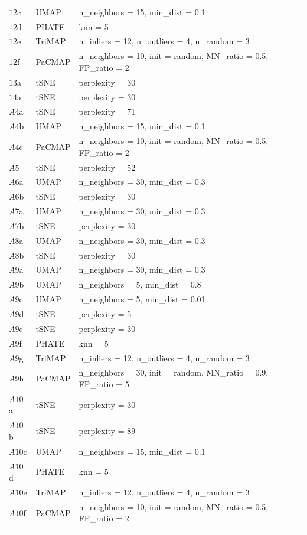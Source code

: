 \documentclass[
  11pt,
  a4paper,
]{report}
\begin{document}
\begin{longtable}{>{\raggedright\arraybackslash}p{1.5cm}>{\raggedright\arraybackslash}p{2cm}>{\raggedright\arraybackslash}p{10cm}}
$12$c & UMAP & n\_neighbors = 15, min\_dist = 0.1\\
$12$d & PHATE & knn = 5\\
$12$e & TriMAP & n\_inliers = 12, n\_outliers = 4, n\_random = 3\\
$12$f & PaCMAP & n\_neighbors = 10, init = random, MN\_ratio = 0.5, FP\_ratio = 2\\
\midrule
$13$a & tSNE & perplexity = 30\\
\midrule
$14$a & tSNE & perplexity = 30\\
\midrule
$A4$a & tSNE & perplexity = 71\\
$A4$b & UMAP & n\_neighbors = 15, min\_dist = 0.1\\
$A4$c & PaCMAP & n\_neighbors = 10, init = random, MN\_ratio = 0.5, FP\_ratio = 2\\
\midrule
$A5$ & tSNE & perplexity = 52\\
\midrule
$A6$a & UMAP & n\_neighbors = 30, min\_dist = 0.3\\
$A6$b & tSNE & perplexity = 30\\
\midrule
$A7$a & UMAP & n\_neighbors = 30, min\_dist = 0.3\\
$A7$b & tSNE & perplexity = 30\\
\midrule
$A8$a & UMAP & n\_neighbors = 30, min\_dist = 0.3\\
$A8$b & tSNE & perplexity = 30\\
\midrule
$A9$a & UMAP & n\_neighbors = 30, min\_dist = 0.3\\
$A9$b & UMAP & n\_neighbors = 5, min\_dist = 0.8\\
$A9$c & UMAP & n\_neighbors = 5, min\_dist = 0.01\\
$A9$d & tSNE & perplexity = 5\\
$A9$e & tSNE & perplexity = 30\\
$A9$f & PHATE & knn = 5\\
$A9$g & TriMAP & n\_inliers = 12, n\_outliers = 4, n\_random = 3\\
$A9$h & PaCMAP & n\_neighbors = 30, init = random, MN\_ratio = 0.9, FP\_ratio = 5\\
\midrule
$A10$a & tSNE & perplexity = 30\\
$A10$b & tSNE & perplexity = 89\\
$A10$c & UMAP & n\_neighbors = 15, min\_dist = 0.1\\
$A10$d & PHATE & knn = 5\\
$A10$e & TriMAP & n\_inliers = 12, n\_outliers = 4, n\_random = 3\\
$A10$f & PaCMAP & n\_neighbors = 10, init = random, MN\_ratio = 0.5, FP\_ratio = 2\\*

\end{longtable}
\end{document}
